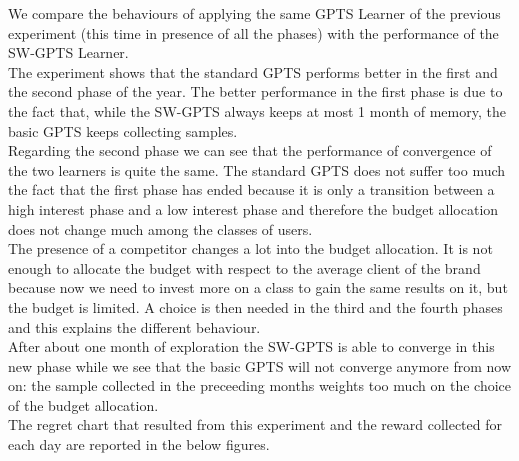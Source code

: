 We compare the behaviours of applying the same GPTS Learner of the previous experiment (this time in presence of all the phases) with the performance of the SW-GPTS Learner.
\\The experiment shows that the standard GPTS performs better in the first and the second phase of the year.  The better performance in the first phase is due to the fact that, while the SW-GPTS always keeps at most 1 month of memory, the basic GPTS keeps collecting samples. 
\\Regarding the second phase we can see that the performance of convergence of the two learners is quite the same. The standard GPTS does not suffer too much the fact that the first phase has ended because it is only a transition between a high interest phase and a low interest phase and therefore the budget allocation does not change much among the classes of users.
\\The presence of a competitor changes a lot into the budget allocation. It is not enough to allocate the budget with respect to the average client of the brand because now we need to invest more on a class to gain the same results on it, but the budget is limited. A choice is then needed in the third and the fourth phases and this explains the different behaviour. 
\\After about one month of exploration the SW-GPTS is able to converge in this new phase while we see that the basic GPTS will not converge anymore from now on: the sample collected in the preceeding months weights too much on the choice of the budget allocation.
\\The regret chart that resulted from this experiment and the reward collected for each day are reported in the below figures.\\
